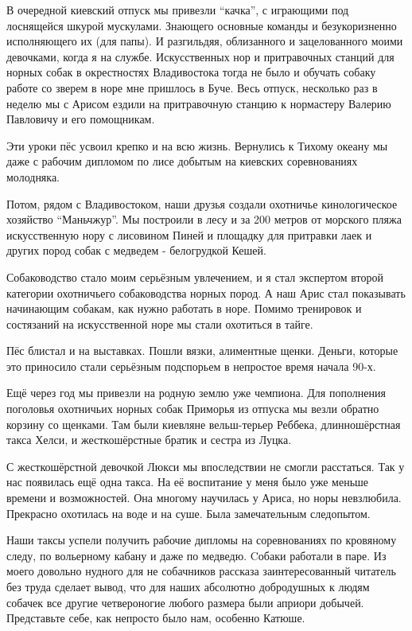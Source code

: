 В очередной киевский отпуск мы привезли \enquote{качка}, с играющими под
лоснящейся шкурой мускулами. Знающего основные команды и безукоризненно
исполняющего их (для папы). И разгильдяя, облизанного и зацелованного моими
девочками, когда я на службе. Искусственных нор и притравочных станций для
норных собак в окрестностях Владивостока тогда не было и обучать собаку работе
со зверем в норе мне пришлось в Буче. Весь отпуск, несколько раз в неделю мы с
Арисом ездили на притравочную станцию к нормастеру Валерию Павловичу и его
помощникам.

Эти уроки пёс усвоил крепко и на всю жизнь. Вернулись к Тихому океану мы даже с
рабочим дипломом по лисе добытым на киевских соревнованиях молодняка. 

Потом, рядом с Владивостоком, наши друзья создали охотничье кинологическое
хозяйство \enquote{Маньчжур}. Мы построили в лесу и за 200 метров от морского
пляжа искусственную нору с лисовином Пиней и площадку для притравки лаек и
других пород собак с медведем - белогрудкой Кешей. 

Собаководство стало моим серьёзным увлечением, и
я стал экспертом второй категории охотничьего собаководства норных пород. А наш
Арис стал показывать начинающим собакам, как нужно работать в норе. Помимо
тренировок и состязаний на искусственной норе мы стали охотиться в тайге. 

Пёс блистал и на выставках. Пошли вязки, алиментные щенки. Деньги, которые это
приносило стали серьёзным подспорьем в непростое время начала 90-х. 

Ещё через год мы привезли на родную землю уже чемпиона. Для пополнения
поголовья охотничьих норных собак Приморья из отпуска мы везли обратно корзину
со щенками. Там были киевляне вельш-терьер Реббека, длинношёрстная такса Хелси,
и жесткошёрстные братик и сестра из Луцка. 

С жесткошёрстной девочкой Люкси мы впоследствии не смогли расстаться. Так у нас
появилась ещё одна такса. На её воспитание у меня было уже меньше времени и
возможностей. Она многому научилась у Ариса, но норы невзлюбила. Прекрасно
охотилась на воде и на суше. Была замечательным следопытом. 

Наши таксы успели получить рабочие дипломы на соревнованиях по кровяному следу,
по вольерному кабану и даже по медведю.  Cобаки работали в паре. Из моего
довольно нудного для не собачников рассказа заинтересованный читатель без труда
сделает вывод, что для наших абсолютно добродушных к людям собачек все другие
четвероногие любого размера были априори добычей. Представьте себе, как
непросто было нам, особенно Катюше. 

